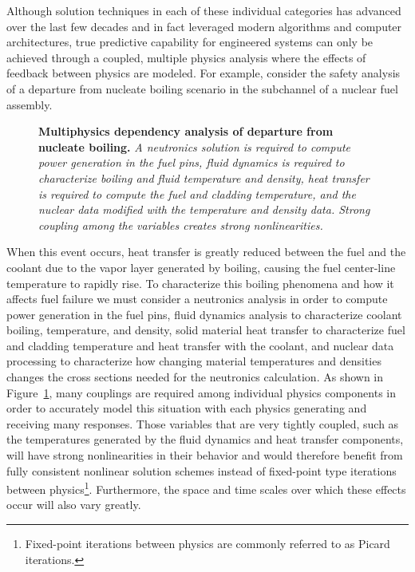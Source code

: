 Although solution techniques in each of these individual categories
has advanced over the last few decades and in fact leveraged modern
algorithms and computer architectures, true predictive capability for
engineered systems can only be achieved through a coupled, multiple
physics analysis where the effects of feedback between physics are
modeled. For example, consider the safety analysis of a departure from
nucleate boiling scenario in the subchannel of a nuclear fuel
assembly.
\begin{figure}[htpb!]
  \begin{center}
    \scalebox{1.5}{
       }
  \end{center}
  \caption{\textbf{Multiphysics dependency analysis of departure from
      nucleate boiling.} \textit{A neutronics solution is required to
      compute power generation in the fuel pins, fluid dynamics is
      required to characterize boiling and fluid temperature and
      density, heat transfer is required to compute the fuel and
      cladding temperature, and the nuclear data modified with the
      temperature and density data. Strong coupling among the
      variables creates strong nonlinearities.}}
  \label{fig:dnb_example}
\end{figure}
When this event occurs, heat transfer is greatly reduced between the
fuel and the coolant due to the vapor layer generated by boiling,
causing the fuel center-line temperature to rapidly rise. To
characterize this boiling phenomena and how it affects fuel failure we
must consider a neutronics analysis in order to compute power
generation in the fuel pins, fluid dynamics analysis to characterize
coolant boiling, temperature, and density, solid material heat
transfer to characterize fuel and cladding temperature and heat
transfer with the coolant, and nuclear data processing to characterize
how changing material temperatures and densities changes the cross
sections needed for the neutronics calculation. As shown in
Figure~\ref{fig:dnb_example}, many couplings are required among
individual physics components in order to accurately model this
situation with each physics generating and receiving many
responses. Those variables that are very tightly coupled, such as the
temperatures generated by the fluid dynamics and heat transfer
components, will have strong nonlinearities in their behavior and
would therefore benefit from fully consistent nonlinear solution
schemes instead of fixed-point type iterations between
physics\footnote{Fixed-point iterations between physics are commonly
  referred to as Picard iterations.}. Furthermore, the space and time
scales over which these effects occur will also vary greatly.

